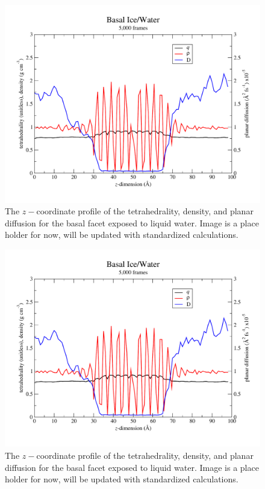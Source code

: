 \documentclass[aps,jcp,preprint,showpacs,superscriptaddress,groupedaddress]{revtex4}  %
\begin{document}
\newpage
\begin{figure}
\includegraphics[width=\linewidth]{basal_iw}
\caption{\label{fig:basal_pqD} The $z-$coordinate profile of the tetrahedrality, density, and planar diffusion for the basal facet exposed to liquid water. Image is a place holder for now, will be updated with standardized calculations.}
\end{figure}

\newpage
\begin{figure}
\includegraphics[width=\linewidth]{basal_iw}
\caption{\label{fig:prismatic_pqD} The $z-$coordinate profile of the tetrahedrality, density, and planar diffusion for the basal facet exposed to liquid water. Image is a place holder for now, will be updated with standardized calculations.}
\end{figure}
\end{document}
